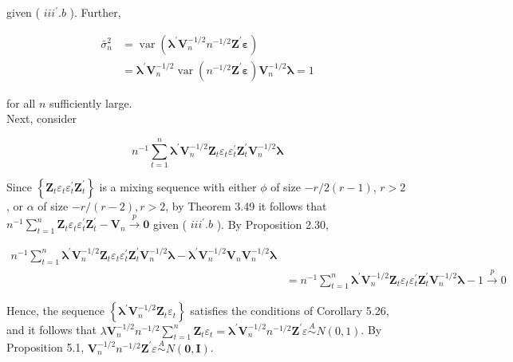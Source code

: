 \documentclass[10pt]{article}
\begin{document}
given ( $i i i^{\prime} . b$ ). Further,

$$
\begin{aligned}
\bar{\sigma}_{n}^{2} & =\operatorname{var}\left(\boldsymbol{\lambda}^{\prime} \mathbf{V}_{n}^{-1 / 2} n^{-1 / 2} \mathbf{Z}^{\prime} \boldsymbol{\varepsilon}\right) \\
& =\boldsymbol{\lambda}^{\prime} \mathbf{V}_{n}^{-1 / 2} \operatorname{var}\left(n^{-1 / 2} \mathbf{Z}^{\prime} \boldsymbol{\varepsilon}\right) \mathbf{V}_{n}^{-1 / 2} \boldsymbol{\lambda}=1
\end{aligned}
$$

for all $n$ sufficiently large.\\
Next, consider

$$
n^{-1} \sum_{t=1}^{n} \boldsymbol{\lambda}^{\prime} \mathbf{V}_{n}^{-1 / 2} \mathbf{Z}_{t} \varepsilon_{t} \varepsilon_{t}^{\prime} \mathbf{Z}_{t}^{\prime} \mathbf{V}_{n}^{-1 / 2} \boldsymbol{\lambda}
$$

Since $\left\{\mathbf{Z}_{t} \varepsilon_{t} \varepsilon_{t}^{\prime} \mathbf{Z}_{t}^{\prime}\right\}$ is a mixing sequence with either $\phi$ of size $-r / 2(r-1)$, $r>2$, or $\alpha$ of size $-r /(r-2), r>2$, by Theorem 3.49 it follows that $n^{-1} \sum_{t=1}^{n} \mathbf{Z}_{t} \varepsilon_{t} \varepsilon_{t}^{\prime} \mathbf{Z}_{t}^{\prime}-\mathbf{V}_{n} \xrightarrow{p} \mathbf{0}$ given ( $i i i^{\prime} . b$ ). By Proposition 2.30,

$$
\begin{aligned}
n^{-1} \sum_{t=1}^{n} \boldsymbol{\lambda}^{\prime} \mathbf{V}_{n}^{-1 / 2} \mathbf{Z}_{t} \varepsilon_{t} \varepsilon_{t}^{\prime} \mathbf{Z}_{t}^{\prime} \mathbf{V}_{n}^{-1 / 2} \boldsymbol{\lambda}-\boldsymbol{\lambda}^{\prime} \mathbf{V}_{n}^{-1 / 2} \mathbf{V}_{n} \mathbf{V}_{n}^{-1 / 2} \boldsymbol{\lambda} & \\
& =n^{-1} \sum_{t=1}^{n} \boldsymbol{\lambda}^{\prime} \mathbf{V}_{n}^{-1 / 2} \mathbf{Z}_{t} \varepsilon_{t} \varepsilon_{t}^{\prime} \mathbf{Z}_{t}^{\prime} \mathbf{V}_{n}^{-1 / 2} \boldsymbol{\lambda}-1 \xrightarrow{p} 0
\end{aligned}
$$

Hence, the sequence $\left\{\boldsymbol{\lambda}^{\prime} \mathbf{V}_{n}^{-1 / 2} \mathbf{Z}_{t} \varepsilon_{t}\right\}$ satisfies the conditions of Corollary 5.26, and it follows that $\lambda \mathbf{V}_{n}^{-1 / 2} n^{-1 / 2} \sum_{t=1}^{n} \mathbf{Z}_{t} \varepsilon_{t}=\boldsymbol{\lambda}^{\prime} \mathbf{V}_{n}^{-1 / 2} n^{-1 / 2} \mathbf{Z}^{\prime} \varepsilon \stackrel{A}{\sim} N(0,1)$. By Proposition 5.1, $\mathbf{V}_{n}^{-1 / 2} n^{-1 / 2} \mathbf{Z}^{\prime} \varepsilon \stackrel{A}{\sim} N(\mathbf{0}, \mathbf{I})$.
\end{document}
